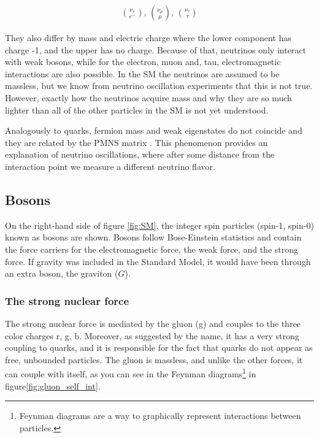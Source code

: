 \begin{align}
    \binom{\nu_e}{e^-} \text{,  } \binom{\nu_\mu}{\mu} \text{,  } \binom{\nu_\tau}{\tau}
\end{align}

They also differ by mass and electric charge where the lower component has charge -1, and the upper has no charge. Because of that, neutrinos only interact with weak bosons, while for the electron, muon and, tau, electromagnetic interactions are also possible. In the SM the neutrinos are assumed to be massless, but we know from neutrino oscillation experiments that this is not true. However, exactly how the neutrinos acquire mass and why they are so much lighter than all of the other particles in the SM is not yet understood. 

Analogously to quarks, fermion mass and weak eigenstates do not coincide and they are related by the PMNS matrix \cite{thomson}. This phenomenon provides an explanation of neutrino oscillations, where after some distance from the interaction point we measure a different neutrino flavor. 


\subsection{Bosons}
On the right-hand side of figure \ref{fig:SM}, the integer spin particles (spin-1, spin-0) known as bosons \cite{thomson} are shown. Bosons follow Bose-Einstein statistics and contain the force carriers for the electromagnetic force, the weak force, and the strong force. If gravity was included in the Standard Model, it would have been through an extra boson, the graviton ($G$).

\subsubsection{The strong nuclear force}
The strong nuclear force is mediated by the gluon (g) \cite{thomson} and couples to the three color charges r, g, b. Moreover, as suggested by the name, it has a very strong coupling to quarks, and it is responsible for the fact that quarks do not appear as free, unbounded particles. The gluon is massless, and unlike the other forces, it can couple with itself, as you can see in the Feynman diagrams\footnote{Feynman diagrams are a way to graphically represent interactions between particles.} in figure\ref{fig:gluon_self_int}.

